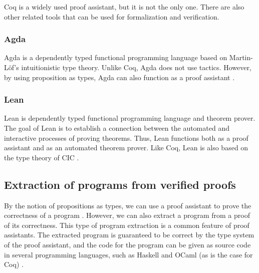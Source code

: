 Coq is a widely used proof assistant, but it is not the only one.
There are also other related tools that can be used for formalization and verification.

\subsubsection{Agda}
\label{sssec:agda}

Agda is a dependently typed functional programming language based on Martin-Löf's
intuitionistic type theory. Unlike Coq, Agda does not use tactics.
However, by using proposition as types, Agda can also function as a proof assistant
\cite{agdatut}.

\subsubsection{Lean}
\label{sssec:lean}

Lean is dependently typed functional programming language and theorem prover.
The goal of Lean is to establish a connection between the automated and interactive processes of proving theorems.
Thus, Lean functions both as a proof assistant and as an automated theorem prover.
Like Coq, Lean is also based on the type theory of CIC
\cite{lean}.

\subsection{Extraction of programs from verified proofs}
\label{ssec:extraction_of_programs_from_verified_proofs}

By the notion of propositions as types, we can use a proof assistant to
prove the correctness of a program \cite[Preface]{bpierce}. However, we can also extract a program from
a proof of its correctness. This type of program extraction is a common feature of proof assistants.
The extracted program is guaranteed to be correct by the type system of the proof assistant,
and the code for the program can be given as source code
in several programming languages, such as Haskell and OCaml (as is the case for Coq) \cite{cintro}.
